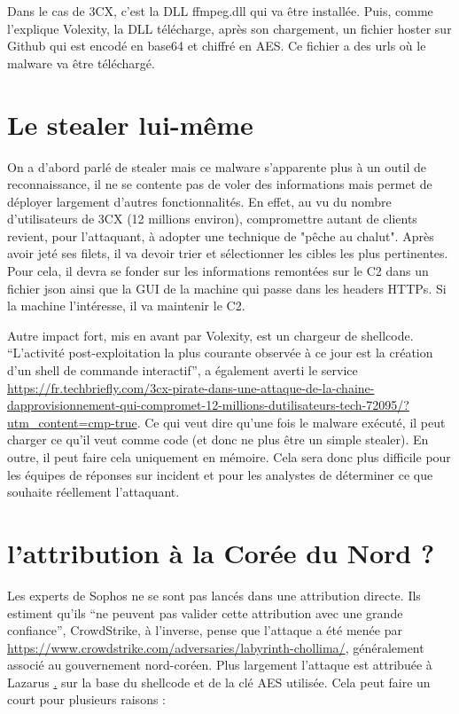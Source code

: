 \documentclass[a4paper]{article}
\begin{document}
Dans le cas de 3CX, c'est la DLL ffmpeg.dll qui va être installée. Puis, comme l'explique Volexity, la DLL télécharge, après son chargement, un fichier hoster sur Github qui est encodé en base64 et chiffré en AES. Ce fichier a des urls où le malware va être téléchargé.
\\

\section{Le stealer lui-même}

On a d'abord parlé de stealer mais ce malware s'apparente plus à un outil de reconnaissance, il ne se contente pas de voler des informations mais permet de déployer largement d'autres fonctionnalités. En effet, au vu du nombre d'utilisateurs de 3CX (12 millions environ), compromettre autant de clients revient, pour l'attaquant, à adopter une technique de "pêche au chalut". Après avoir jeté ses filets, il va devoir trier et sélectionner les cibles les plus pertinentes. Pour cela, il devra se fonder sur les informations remontées sur le C2 dans un fichier json ainsi que la GUI de la machine qui passe dans les headers HTTPs. Si la machine l'intéresse, il va maintenir le C2.

Autre impact fort, mis en avant par Volexity, est un chargeur de shellcode. “L’activité post-exploitation la plus courante observée à ce jour est la création d’un shell de commande interactif”, a également averti le service  \href{Managed Detection and Response de Sophos}{https://fr.techbriefly.com/3cx-pirate-dans-une-attaque-de-la-chaine-dapprovisionnement-qui-compromet-12-millions-dutilisateurs-tech-72095/?utm_content=cmp-true}. Ce qui veut dire qu'une fois le malware exécuté, il peut charger ce qu'il veut comme code (et donc ne plus être un simple stealer). En outre, il peut faire cela uniquement en mémoire. Cela sera donc plus difficile pour les équipes de réponses sur incident et pour les analystes de déterminer ce que souhaite réellement l'attaquant. 


\section{l'attribution à la Corée du Nord ?}

Les experts de Sophos ne se sont pas lancés dans une attribution directe. Ils estiment qu’ils “ne peuvent pas valider cette attribution avec une grande confiance”, CrowdStrike, à l'inverse, pense que l’attaque a été menée par \href{Labyrinth Collima }{https://www.crowdstrike.com/adversaries/labyrinth-chollima/}, généralement associé au gouvernement nord-coréen. Plus largement l'attaque est attribuée à Lazarus \href{https://attack.mitre.org/groups/G0032/}. sur la base du shellcode et de la clé AES utilisée. Cela peut faire un court pour plusieurs raisons :
\end{document}
